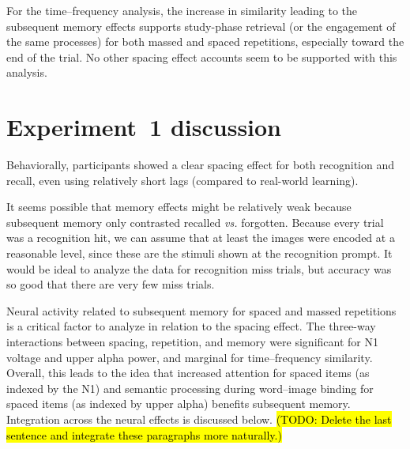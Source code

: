 For the time--frequency analysis, the increase in similarity leading to the subsequent memory effects supports study-phase retrieval (or the engagement of the same processes) for both massed and spaced repetitions, especially toward the end of the trial.  No other spacing effect accounts seem to be supported with this analysis.







\section{Experiment~1 discussion}

Behaviorally, participants showed a clear spacing effect for both recognition and recall, even using relatively short lags (compared to real-world learning).

It seems possible that memory effects might be relatively weak because subsequent memory only contrasted recalled \textit{vs.} forgotten.  Because every trial was a recognition hit, we can assume that at least the images were encoded at a reasonable level, since these are the stimuli shown at the recognition prompt.  It would be ideal to analyze the data for recognition miss trials, but accuracy was so good that there are very few miss trials.

\cbstart
Neural activity related to subsequent memory for spaced and massed repetitions is a critical factor to analyze in relation to the spacing effect.  The three-way interactions between spacing, repetition, and memory were significant for N1 voltage and upper alpha power, and marginal for time--frequency similarity.  Overall, this leads to the idea that increased attention for spaced items (as indexed by the N1) and semantic processing during word--image binding for spaced items (as indexed by upper alpha) benefits subsequent memory.
Integration across the neural effects is discussed below.  \hl{(TODO: Delete the last sentence and integrate these paragraphs more naturally.)}



